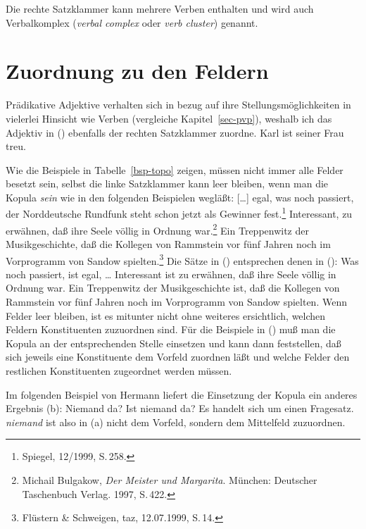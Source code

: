 Die rechte Satzklammer kann mehrere Verben enthalten und wird auch 
Verbalkomplex (\emph{verbal complex} oder \emph{verb cluster}) genannt.

\section{Zuordnung zu den Feldern}

Prädikative Adjektive verhalten sich in bezug auf ihre Stellungsmöglichkeiten in vielerlei Hinsicht
wie Verben (vergleiche Kapitel~\ref{sec-pvp}), weshalb ich das Adjektiv in () ebenfalls der
rechten Satzklammer zuordne.
\ea
Karl ist seiner Frau treu.
\z

\noindent
Wie die Beispiele in Tabelle~\ref{bsp-topo} zeigen, müssen nicht immer
alle Felder besetzt sein, selbst die linke Satzklammer kann leer bleiben,
wenn man die Kopula \emph{sein} wie in den folgenden Beispielen wegläßt:
\eal
\ex
{}[\ldots]
egal,      was  noch  passiert, der Norddeutsche Rundfunk             steht  schon   jetzt als Gewinner fest.\footnote{
        Spiegel, 12/1999, S.\,258.
}
\ex Interessant, zu erwähnen, daß ihre Seele völlig    in Ordnung war.\footnote{
        Michail Bulgakow, \emph{Der Meister und Margarita}. München: Deutscher Taschenbuch Verlag. 1997, S.\,422.
      }
\ex
Ein Treppenwitz der    Musikgeschichte, daß die Kollegen   von Rammstein vor    fünf Jahren noch im      Vorprogramm   von Sandow spielten.\footnote{
         Flüstern \& Schweigen, taz, 12.07.1999, S.\,14. %
}
\zl
Die Sätze in () entsprechen denen in ():
\eal
\ex 
Was noch passiert, ist egal, \ldots
\ex
Interessant ist zu erwähnen, daß ihre Seele völlig in Ordnung war.
\ex 
Ein Treppenwitz der Musikgeschichte ist, daß die Kollegen von Rammstein vor fünf Jahren noch im Vorprogramm von Sandow spielten.
\zl
Wenn Felder leer bleiben, ist es mitunter nicht ohne weiteres
ersichtlich, welchen Feldern Konstituenten zuzuordnen sind.
Für die Beispiele in () muß man die Kopula an der entsprechenden Stelle einsetzen und kann
dann feststellen, daß sich jeweils eine Konstituente dem Vorfeld zuordnen läßt und welche Felder
den restlichen Konstituenten zugeordnet werden müssen.

Im folgenden Beispiel von Hermann \citet[]{Paul1919a} liefert die Einsetzung der Kopula
ein anderes Ergebnis (b):
\eal
\ex Niemand da?
\ex Ist niemand da?
\zl
Es handelt sich um einen Fragesatz. \emph{niemand} ist also in (a)
nicht dem Vorfeld, sondern dem Mittelfeld zuzuordnen.

